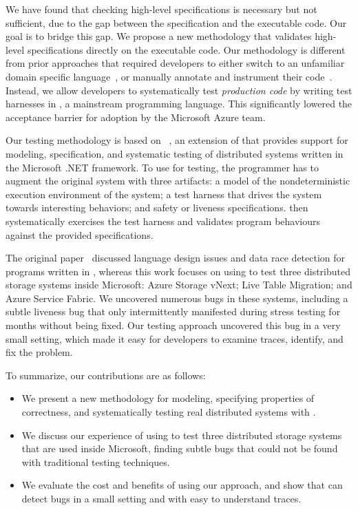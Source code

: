 We have found that checking high-level specifications is necessary but not sufficient, due to the gap between the specification and the executable code. Our goal is to bridge this gap. We propose a new methodology that validates high-level specifications directly on the executable code. Our methodology is different from prior approaches that required developers to either switch to an unfamiliar domain specific language~\cite{killian2007life, desai2015building}, or manually annotate and instrument their code~\cite{simsa2011dbug}. Instead, we allow developers to systematically test \emph{production code} by writing test harnesses in \csharp, a mainstream programming language. This significantly lowered the acceptance barrier for adoption by the Microsoft Azure team.

Our testing methodology is based on \psharp~\cite{deligiannis2015psharp}, an extension of \csharp that provides support for modeling, specification, and systematic testing of distributed systems written in the Microsoft .NET framework. To use \psharp for testing, the programmer has to augment the original system with three artifacts: a model of the nondeterministic execution environment of the system; a test harness that drives the system towards interesting behaviors; and safety or liveness specifications. \psharp then systematically exercises the test harness and validates program behaviours against the provided specifications.

The original \psharp paper~\cite{deligiannis2015psharp} discussed language design issues and data race detection for programs written in \psharp, whereas this work focuses on using \psharp to test three distributed storage systems inside Microsoft: Azure Storage vNext; Live Table Migration; and Azure Service Fabric. We uncovered numerous bugs in these systems, including a subtle liveness bug that only intermittently manifested during stress testing for months without being fixed. Our testing approach uncovered this bug in a very small setting, which made it easy for developers to examine traces, identify, and fix the problem.

To summarize, our contributions are as follows:
\begin{itemize}
\item We present a new methodology for modeling, specifying properties of correctness, and systematically testing real distributed systems with \psharp.
\item We discuss our experience of using \psharp to test three distributed storage systems that are used inside Microsoft, finding subtle bugs that could not be found with traditional testing techniques.
\item We evaluate the cost and benefits of using our approach, and show that \psharp can detect bugs in a small setting and with easy to understand traces.
\end{itemize}
